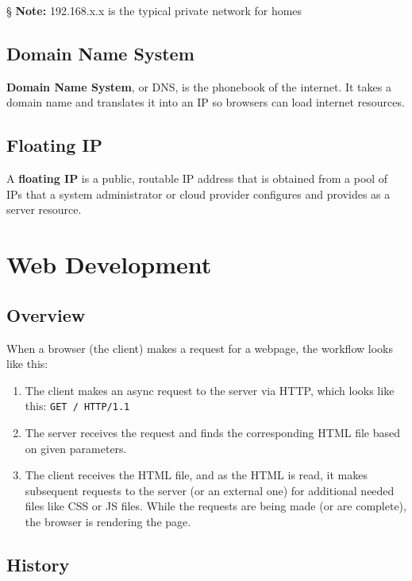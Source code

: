 \documentclass{report}
\newcommand{\npar}{\par\noindent}
\newcommand{\vpar}{\vspace{1em}\npar}
\newcommand{\note}{\vpar \S \textbf{ Note: }}
\begin{document}
\note 192.168.x.x is the typical private network for homes

\section{Domain Name System}

\par \textbf{Domain Name System}, or DNS, is the phonebook of the internet. It takes a domain name and translates it into an IP so browsers can load internet resources.

\section{Floating IP}

\par A \textbf{floating IP} is a public, routable IP address that is obtained from a pool of IPs that a system administrator or cloud provider configures and provides as a server resource.

\chapter{Web Development}

\section{Overview}

\par When a browser (the client) makes a request for a webpage, the workflow looks like this:
\begin{enumerate}
    \item The client makes an async request to the server via HTTP, which looks like this: \verb|GET / HTTP/1.1|
    \item The server receives the request and finds the corresponding HTML file based on given parameters.
    \item The client receives the HTML file, and as the HTML is read, it makes subsequent requests to the server (or an external one) for additional needed files like CSS or JS files. While the requests are being made (or are complete), the browser is rendering the page.
\end{enumerate}

\section{History}
\end{document}
